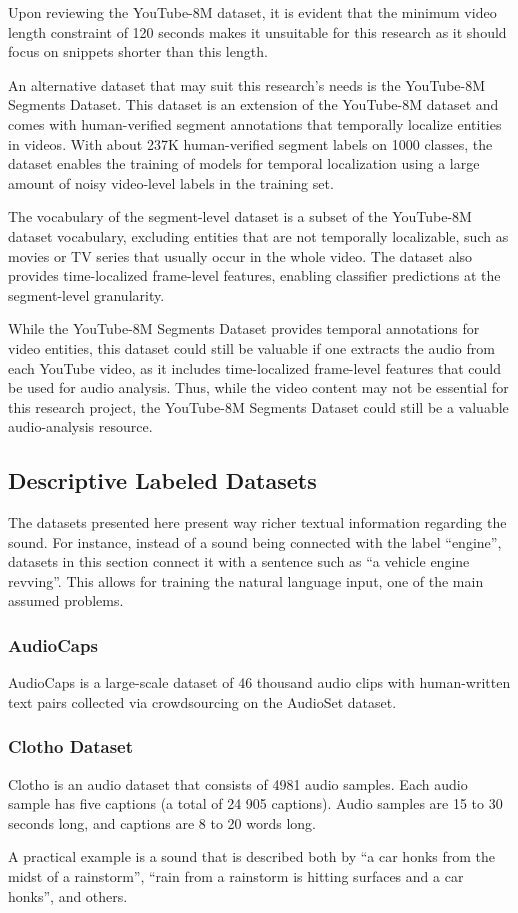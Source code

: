 Upon reviewing the YouTube-8M dataset, it is evident that the minimum video length constraint of 120 seconds makes it unsuitable for this research as it should focus on snippets shorter than this length.

An alternative dataset that may suit this research's needs is the YouTube-8M Segments Dataset. This dataset is an extension of the YouTube-8M dataset and comes with human-verified segment annotations that temporally localize entities in videos. With about 237K human-verified segment labels on 1000 classes, the dataset enables the training of models for temporal localization using a large amount of noisy video-level labels in the training set.

The vocabulary of the segment-level dataset is a subset of the YouTube-8M dataset vocabulary, excluding entities that are not temporally localizable, such as movies or TV series that usually occur in the whole video. The dataset also provides time-localized frame-level features, enabling classifier predictions at the segment-level granularity.

While the YouTube-8M Segments Dataset provides temporal annotations for video entities, this dataset could still be valuable if one extracts the audio from each YouTube video, as it includes time-localized frame-level features that could be used for audio analysis. Thus, while the video content may not be essential for this research project, the YouTube-8M Segments Dataset could still be a valuable audio-analysis resource.

\subsection{Descriptive Labeled Datasets} \label{sec:sound-nl-labelled}

The datasets presented here present way richer textual information regarding the sound. For instance, instead of a sound being connected with the label ``engine'', datasets in this section connect it with a sentence such as ``a vehicle engine revving''. This allows for training the natural language input, one of the main assumed problems.

\subsubsection{AudioCaps}

AudioCaps \cite{kim_audiocaps_2019} is a large-scale dataset of 46 thousand audio clips with human-written text pairs collected via crowdsourcing on the AudioSet dataset.

\subsubsection{Clotho Dataset} \label{sec:clotho}

Clotho \cite{drossos_clotho_2019} is an audio dataset that consists of 4981 audio samples. Each audio sample has five captions (a total of 24 905 captions). Audio samples are 15 to 30 seconds long, and captions are 8 to 20 words long. 

A practical example is a sound that is described both by ``a car honks from the midst of a rainstorm'', ``rain from a rainstorm is hitting surfaces and a car honks'', and others.